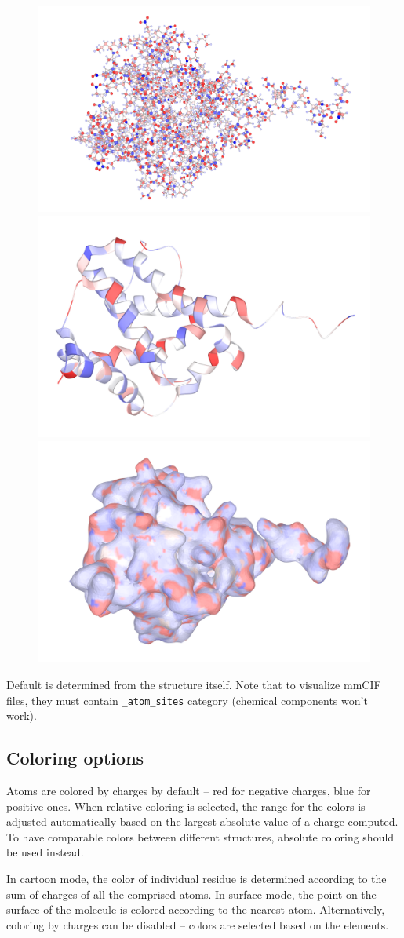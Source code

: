 \documentclass[oneside]{memoir}
\begin{document}
\begin{figure}[h!]
\includegraphics[width=.45\linewidth]{images/bas.png}
\includegraphics[width=.45\linewidth]{images/cartoon.png}
\includegraphics[width=.45\linewidth]{images/surface.png}
\end{figure}

Default is determined from the structure itself.
Note that to visualize mmCIF files, they must contain \texttt{\_atom\_sites} category (chemical components won't work).

\subsection*{Coloring options}
Atoms are colored by charges by default – red for negative charges, blue for positive ones. When relative coloring is selected, the range for the colors is adjusted automatically based on the largest absolute value of a charge computed. To have comparable colors between different structures, absolute coloring should be used instead.

In cartoon mode, the color of individual residue is determined according to the sum of charges of all the comprised atoms. In surface mode, the point on the surface of the molecule is colored according to the nearest atom. Alternatively, coloring by charges can be disabled – colors are selected based on the elements.
\end{document}
